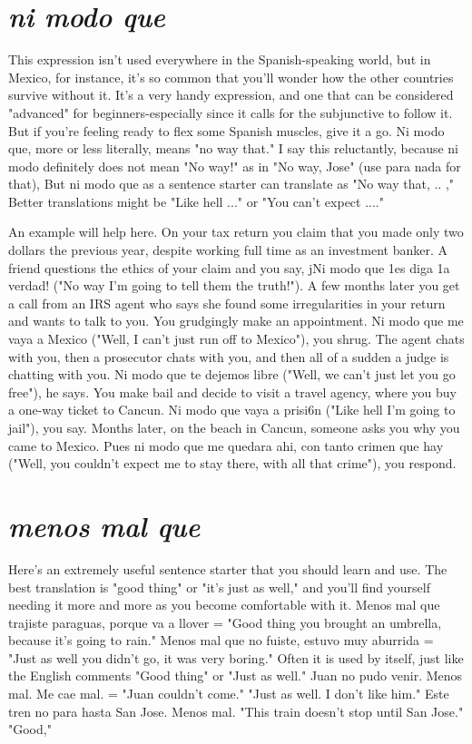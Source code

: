 \section{\emph{ni modo que}}

This expression isn't used everywhere in the Spanish-speaking
world, but in Mexico, for instance, it's so common that you'll wonder
how the other countries survive without it. It's a very handy expression, and one that can be considered "advanced" for beginners-especially since it calls for the subjunctive to follow it. But if you're feeling
ready to flex some Spanish muscles, give it a go. Ni modo que, more or
less literally, means "no way that." I say this reluctantly, because ni
modo definitely does not mean "No way!" as in "No way, Jose" (use
para nada for that), But ni modo que as a sentence starter can translate as "No way that, .. ," Better translations might be "Like hell ..."
or "You can't expect ...."

An example will help here. On your tax return you claim that
you made only two dollars the previous year, despite working full time
as an investment banker. A friend questions the ethics of your claim
and you say, jNi modo que 1es diga 1a verdad! ("No way I'm going to
tell them the truth!"). A few months later you get a call from an IRS
agent who says she found some irregularities in your return and wants
to talk to you. You grudgingly make an appointment. Ni modo que me
vaya a Mexico ("Well, I can't just run off to Mexico"), you shrug. The
agent chats with you, then a prosecutor chats with you, and then all of
a sudden a judge is chatting with you. Ni modo que te dejemos libre
("Well, we can't just let you go free"), he says. You make bail and decide to visit a travel agency, where you buy a one-way ticket to Cancun. Ni modo que vaya a prisi6n ("Like hell I'm going to jail"), you
say. Months later, on the beach in Cancun, someone asks you why you
came to Mexico. Pues ni modo que me quedara ahi, con tanto crimen
que hay ("Well, you couldn't expect me to stay there, with all that
crime"), you respond.

\section{\emph{menos mal que}}

Here's an extremely useful sentence starter that you should
learn and use. The best translation is "good thing" or "it's just as
well," and you'll find yourself needing it more and more as you become
comfortable with it. Menos mal que trajiste paraguas, porque va a
llover = "Good thing you brought an umbrella, because it's going to
rain." Menos mal que no fuiste, estuvo muy aburrida = "Just as well
you didn't go, it was very boring." Often it is used by itself, just like
the English comments "Good thing" or "Just as well." Juan no pudo
venir. Menos mal. Me cae mal. = "Juan couldn't come." "Just as well.
I don't like him." Este tren no para hasta San Jose. Menos mal.
"This train doesn't stop until San Jose." "Good,"

